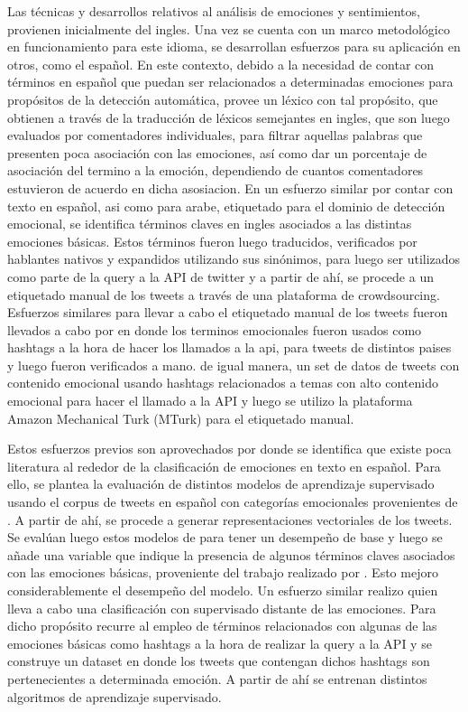 Las técnicas y desarrollos relativos al análisis de emociones y sentimientos, provienen inicialmente del ingles. Una vez se cuenta con un marco metodológico en funcionamiento para este idioma, se desarrollan esfuerzos para su aplicación en otros, como el español. En este contexto, debido a la necesidad de contar con términos en español que puedan ser relacionados a determinadas emociones para propósitos de la detección automática, \cite{sidorov2012empirical} provee un léxico con tal propósito, que obtienen a través de la traducción de léxicos semejantes en ingles, que son luego evaluados por comentadores individuales, para filtrar aquellas palabras que presenten poca asociación con las emociones, así como dar un porcentaje de asociación del termino a la emoción, dependiendo de cuantos comentadores estuvieron de acuerdo en dicha asosiacion. En un esfuerzo similar por contar con texto en español, asi como para arabe, etiquetado para el dominio de detección emocional,\cite{mohammad2018semeval} se identifica términos claves en ingles asociados a las distintas emociones básicas. Estos términos fueron luego traducidos, verificados por hablantes nativos y expandidos utilizando sus sinónimos, para luego ser utilizados como parte de la query a la API de twitter y a partir de ahí, se procede a un etiquetado manual de los tweets a través de una plataforma de crowdsourcing. Esfuerzos similares para llevar a cabo el etiquetado manual de los tweets fueron llevados a cabo por \cite{sidorov2016construccion} en donde los terminos emocionales fueron usados como hashtags a la hora de hacer los llamados a la api, para tweets de distintos paises y luego fueron verificados a mano. de igual manera, \cite{plaza2020emoevent}  un set de datos de tweets con contenido emocional usando hashtags relacionados a temas con alto contenido emocional para hacer el llamado a la API y luego se utilizo la plataforma Amazon Mechanical Turk (MTurk) para el etiquetado manual.

Estos esfuerzos previos son aprovechados por \cite{plaza2020improved} donde se identifica que existe poca literatura al rededor de la clasificación de emociones en texto en español. Para ello, se plantea la evaluación de distintos modelos de aprendizaje supervisado usando el corpus de tweets en español con categorías emocionales provenientes de \cite{mohammad2018semeval}. A partir de ahí, se  procede a generar  representaciones vectoriales de los tweets. Se evalúan luego estos modelos de para tener un desempeño de base y luego se añade una variable que indique la presencia de algunos términos claves asociados con las emociones básicas, proveniente del trabajo realizado por \cite{sidorov2012empirical}. Esto mejoro considerablemente el desempeño del modelo. Un esfuerzo similar realizo \cite{gil2013combining} quien lleva a cabo una clasificación con supervisado distante de las emociones. Para dicho propósito recurre al empleo de términos relacionados con algunas de las emociones básicas como hashtags a la hora de realizar la query a la API y se construye un dataset en donde los tweets que contengan dichos hashtags son pertenecientes a determinada emoción. A partir de ahí se entrenan distintos algoritmos de aprendizaje supervisado.

